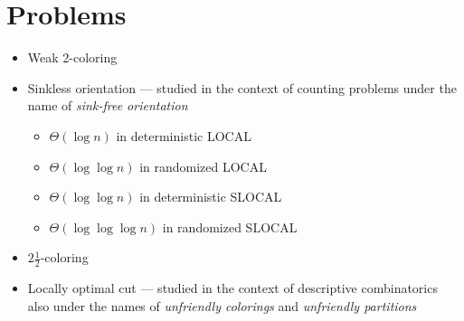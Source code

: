 \documentclass[a4paper,11pt]{article}
\begin{document}
\section{Problems}
\begin{itemize}
    \item Weak 2-coloring \cite{naor-stockmeyer-1995-what-can-be-computed-locally}
    \item Sinkless orientation \cite{brandt-fischer-etal-2016-a-lower-bound-for-the} --- studied in the context of counting problems under the name of \emph{sink-free orientation} \cite{bubley-dyer-1997-graph-orientations-with-no-sink-and-an}
    \begin{itemize}
        \item $\Theta(\log n)$ in deterministic LOCAL \cite{brandt-fischer-etal-2016-a-lower-bound-for-the,chang-kopelowitz-pettie-2019-an-exponential-separation,ghaffari-su-2017-distributed-degree-splitting-edge}
        \item $\Theta(\log \log n)$ in randomized LOCAL \cite{brandt-fischer-etal-2016-a-lower-bound-for-the,ghaffari-su-2017-distributed-degree-splitting-edge}
        \item $\Theta(\log \log n)$ in deterministic SLOCAL \cite{ghaffari-harris-kuhn-2018-on-derandomizing-local,ghaffari-su-2017-distributed-degree-splitting-edge}
        \item $\Theta(\log \log \log n)$ in randomized SLOCAL \cite{ghaffari-harris-kuhn-2018-on-derandomizing-local,ghaffari-su-2017-distributed-degree-splitting-edge}
    \end{itemize}
    \item $2\frac{1}{2}$-coloring \cite{chang-pettie-2019-a-time-hierarchy-theorem-for-the}
    \item Locally optimal cut \cite{balliu-hirvonen-etal-2019-locality-of-not-so-weak,balliu-boudier-etal-2026-distributed-algorithms-for} --- studied in the context of descriptive combinatorics also under the names of \emph{unfriendly colorings} and \emph{unfriendly partitions} \cite{shelah-milner-2012-graphs-with-no-unfriendly-partitions,conley-2014-measure-theoretic-unfriendly-colorings,conley-marks-unger-2020-measurable-realizations-of,conley-tamuz-2020-unfriendly-colorings-of-graphs-with}
\end{itemize}
\end{document}
